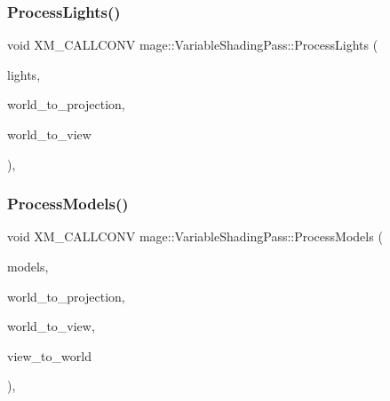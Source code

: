 \hypertarget{classmage_1_1_variable_shading_pass_ad48cdb0fddfa895e44b4537a31578935}{}\label{classmage_1_1_variable_shading_pass_ad48cdb0fddfa895e44b4537a31578935} 
\subsubsection{\texorpdfstring{Process\+Lights()}{ProcessLights()}\hspace{0.1cm}{\footnotesize\ttfamily [3/3]}}
{\footnotesize\ttfamily void X\+M\+\_\+\+C\+A\+L\+L\+C\+O\+NV mage\+::\+Variable\+Shading\+Pass\+::\+Process\+Lights (\begin{DoxyParamCaption}\item[{const vector$<$ const \hyperlink{namespacemage_aeed5dee4ff6c591eabb0e9114256df4a}{Spot\+Light\+Node} $\ast$ $>$ \&}]{lights,  }\item[{F\+X\+M\+M\+A\+T\+R\+IX}]{world\+\_\+to\+\_\+projection,  }\item[{F\+X\+M\+M\+A\+T\+R\+IX}]{world\+\_\+to\+\_\+view }\end{DoxyParamCaption})\hspace{0.3cm}{\ttfamily [private]}, {\ttfamily [noexcept]}}

\hypertarget{classmage_1_1_variable_shading_pass_ac9cbbb4817fed29751b2b1a4549bebda}{}\label{classmage_1_1_variable_shading_pass_ac9cbbb4817fed29751b2b1a4549bebda} 
\subsubsection{\texorpdfstring{Process\+Models()}{ProcessModels()}}
{\footnotesize\ttfamily void X\+M\+\_\+\+C\+A\+L\+L\+C\+O\+NV mage\+::\+Variable\+Shading\+Pass\+::\+Process\+Models (\begin{DoxyParamCaption}\item[{const vector$<$ const \hyperlink{classmage_1_1_model_node}{Model\+Node} $\ast$ $>$ \&}]{models,  }\item[{F\+X\+M\+M\+A\+T\+R\+IX}]{world\+\_\+to\+\_\+projection,  }\item[{F\+X\+M\+M\+A\+T\+R\+IX}]{world\+\_\+to\+\_\+view,  }\item[{F\+X\+M\+M\+A\+T\+R\+IX}]{view\+\_\+to\+\_\+world }\end{DoxyParamCaption})\hspace{0.3cm}{\ttfamily [private]}, {\ttfamily [noexcept]}}

